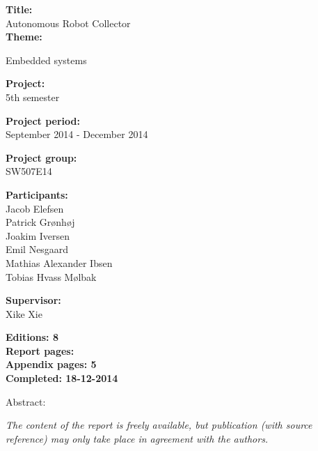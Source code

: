 \begin{minipage}[t]{0.48\textwidth}
\textbf{Title:} \\[5pt]\bigskip\hspace{2ex}
Autonomous Robot Collector\\
\textbf{Theme:} \\[5pt]\bigskip\hspace{2ex}
\parbox{6.6 cm}{
Embedded systems}

\textbf{Project:} \\[5pt]\bigskip\hspace{2ex}
5th semester

\textbf{Project period:} \\[5pt]\bigskip\hspace{2ex}
September 2014 - December 2014

\textbf{Project group:} \\[5pt]\bigskip\hspace{2ex}
SW507E14

\textbf{Participants:} \\[5pt]\hspace*{2ex}
Jacob Elefsen \\\hspace*{2ex}
Patrick Grønhøj \\\hspace*{2ex}
Joakim Iversen \\\hspace*{2ex}
Emil Nesgaard \\\hspace*{2ex}
Mathias Alexander Ibsen \\\hspace*{2ex}
Tobias Hvass Mølbak \\\bigskip\hspace{2ex}

\textbf{Supervisor:} \\[5pt]\hspace*{2ex}
Xike Xie
\vspace*{1cm}

\textbf{Editions: 8} \\
\textbf{Report pages: \pageref{LastPage}} \\
\textbf{Appendix pages: 5} \\
\textbf{Completed: 18-12-2014}

\end{minipage}
\hfill
\begin{minipage}[t]{0.48\textwidth}
Abstract: \\[5pt]
\fbox{\parbox{7cm}{\bigskip\bigskip}}
\end{minipage}

\vfill

{\footnotesize\itshape The content of the report is freely available, but publication (with source reference) may only take place in agreement with the authors.}

